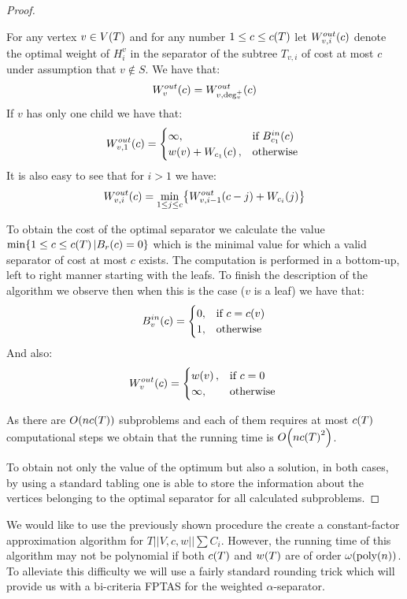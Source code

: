 \begin{theorem}
\begin{proof}
\begin{enumerate}
            For any vertex $v\in V\mathopen{}\left( T \right)$ and for any number $1\leq c\leq c\mathopen{}\left( T \right)$ let $W_{v,i}^{out}\mathopen{}\left( c \right)$ denote the optimal weight of $H_i^v$ in the separator of the subtree $T_{v,i}$ of cost at most $c$ under assumption that $v\notin S$. We have that: 
            $$
            W_{v}^{out}\mathopen{}\left( c \right)=W_{v,\deg_v^+}^{out}\mathopen{}\left( c \right)
            $$ 
            If $v$ has only one child we have that:
            $$
            W_{v,1}^{out}\mathopen{}\left( c \right)=\begin{cases}
                \infty, & \text{if } B_{c_1}^{in}\mathopen{}\left( c \right)\\
                w\mathopen{}\left( v \right) + W_{c_1}\mathopen{}\left( c \right), & \text{otherwise } \\
            \end{cases}
            $$
            It is also easy to see that for $i>1$ we have:
            $$
            W_{v,i}^{out}\mathopen{}\left( c \right)=\min_{1\leq j\leq c}\mathopen{}\left\{ W_{v,i-1}^{out}\mathopen{}\left( c-j \right)+W_{c_i}\mathopen{}\left( j \right) \right\}
            $$
            
            To obtain the cost of the optimal separator we calculate the value $\min\mathopen{}\left\{ 1\leq c \leq c\mathopen{}\left( T \right) | B_{r}\mathopen{}\left( c \right)=0 \right\}$ which is the minimal value for which a valid separator of cost at most $c$ exists. The computation is performed in a bottom-up, left to right manner starting with the leafs. To finish the description of the algorithm we observe then when this is the case ($v$ is a leaf) we have that: 
            $$
            B_v^{in}\mathopen{}\left( c \right)=\begin{cases}
                0, & \text{if } c=c\mathopen{}\left( v \right)\\
                1, & \text{otherwise }\\
            \end{cases}$$
            And also:
            $$
            W_v^{out}\mathopen{}\left( c \right)=\begin{cases}
                w\mathopen{}\left( v \right), & \text{if } c=0\\
                \infty, & \text{otherwise }\\
                \end{cases}
            $$

            As there are $O\mathopen{}\left( nc\mathopen{}\left( T \right) \right)$ subproblems and each of them requires at most $c\mathopen{}\left( T \right)$ computational steps we obtain that the running time is  $O\mathopen{}\left( nc\mathopen{}\left( T \right)^2 \right)$.
        \end{enumerate}
        
         To obtain not only the value of the optimum but also a solution, in both cases, by using a standard tabling one is able to store the information about the vertices belonging to the optimal separator for all calculated subproblems.
    \end{proof}
\end{theorem}
    We would like to use the previously shown procedure the create a constant-factor approximation algorithm for $T||V,c,w||\sum C_i$. However, the running time of this algorithm may not be polynomial if both $c\mathopen{}\left( T \right)$ and $w\mathopen{}\left( T \right)$ are of order $\omega\mathopen{}\left( \text{poly}\mathopen{}\left( n \right) \right)$. To alleviate this difficulty we will use a fairly standard rounding trick which will provide us with  a bi-criteria FPTAS for the weighted $\alpha$-separator.
    
